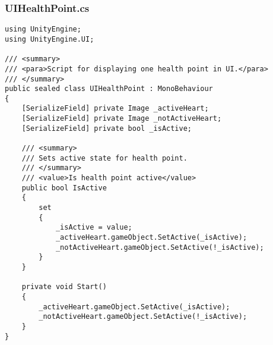 \subsubsection*{UIHealthPoint.cs}
\begin{verbatim}
using UnityEngine;
using UnityEngine.UI;

/// <summary>
/// <para>Script for displaying one health point in UI.</para>
/// </summary>
public sealed class UIHealthPoint : MonoBehaviour
{
    [SerializeField] private Image _activeHeart;
    [SerializeField] private Image _notActiveHeart;
    [SerializeField] private bool _isActive;

    /// <summary>
    /// Sets active state for health point.
    /// </summary>
    /// <value>Is health point active</value>
    public bool IsActive
    {
        set
        {
            _isActive = value;
            _activeHeart.gameObject.SetActive(_isActive);
            _notActiveHeart.gameObject.SetActive(!_isActive);
        }
    }

    private void Start()
    {
        _activeHeart.gameObject.SetActive(_isActive);
        _notActiveHeart.gameObject.SetActive(!_isActive);
    }
}
\end{verbatim}
